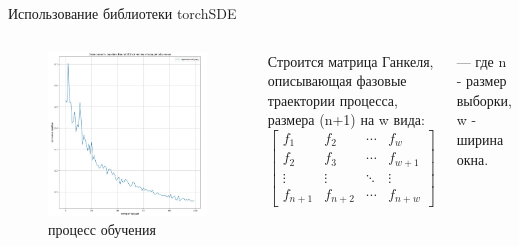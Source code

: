 \documentclass{beamer}
\begin{document}
\begin{frame}{Использование библиотеки torchSDE}


\begin{columns}[c]
\begin{figure}
\includegraphics[width=1.0\textwidth]{loss.jpg}
    \caption{процесс обучения}
\end{figure}
   \par Строится матрица Ганкеля, описывающая фазовые траектории процесса, размера (n+1) на w вида:
    \begin{equation}
 \begin{bmatrix}
   f_1 & f_2 & \cdots & f_{w} \\
   f_2 & f_3 & \cdots & f_{w + 1} \\
   \vdots  & \vdots  & \ddots & \vdots  \\
   f_{n + 1} & f_{n + 2} & \cdots & f_{n + w} 
 \end{bmatrix}
\end{equation}
\par --- где n - размер выборки, w - ширина окна.
\end{columns}

\end{frame}
\end{document}
